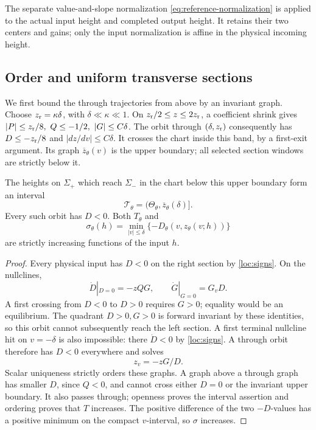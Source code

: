 The separate value-and-slope normalization
\eqref{eq:reference-normalization} is applied to the actual input height
and completed output height. It retains their two centers and gains;
only the input normalization is affine in the physical incoming height.

\subsection{Order and uniform transverse sections}
\label{sec:localization}

We first bound the through trajectories from above by an invariant graph.
Choose \(z_{\rm r}=\kappa\delta\), with
\(\delta\ll\kappa\ll1\). On
\(z_{\rm r}/2\le z\le2z_{\rm r}\), a coefficient shrink gives
\(|P|\le z_{\rm r}/8,\ Q\le-1/2,\ |G|\le C\delta\).
The orbit through \((\delta,z_{\rm r})\) consequently has
\(D\le-z_{\rm r}/8\) and \(|dz/dv|\le C\delta\).
It crosses the chart inside this band, by a first-exit argument.
Its graph \(\overline z_\theta(v)\) is the upper boundary; all
selected section windows are strictly below it.

\begin{lemma}\label{lem:loc-through}
The heights on \(\Sigma_+\) which reach \(\Sigma_-\) in the chart
below this upper boundary form an interval
\begin{equation}\label{loc:through-interval}
 \mathcal T_\theta=(\Theta_\theta,\overline z_\theta(\delta)] .
\end{equation}
Every such orbit has \(D<0\). Both \(T_\theta\) and
\begin{equation}\label{loc:speed-margin}
 \sigma_\theta(h)=\min_{|v|\le\delta}
          \{-D_\theta(v,z_\theta(v;h))\}
\end{equation}
are strictly increasing functions of the input \(h\).
\end{lemma}
\begin{proof}
Every physical input has \(D<0\) on the right section by
\eqref{loc:signs}. On the nullclines,
\begin{equation}\label{loc:nullcline}
 \dot D|_{D=0}=-zQG,\qquad \dot G|_{G=0}=G_vD .
\end{equation}
A first crossing from \(D<0\) to \(D>0\) requires \(G>0\);
equality would be an equilibrium. The quadrant \(D>0,G>0\)
is forward invariant by these identities, so this orbit cannot
subsequently reach the left section. A first terminal nullcline hit on
\(v=-\delta\) is also impossible: there \(\dot D<0\) by
\eqref{loc:signs}. A through orbit therefore has \(D<0\) everywhere
and solves
\begin{equation}\label{loc:graph-equation}
 z_v=-zG/D .
\end{equation}
Scalar uniqueness strictly orders these graphs. A graph above a through
graph has smaller \(D\), since \(Q<0\), and cannot cross either
\(D=0\) or the invariant upper boundary. It also passes through;
openness proves the interval assertion and ordering proves that \(T\)
increases. The positive difference of the two \(-D\)-values has a
positive minimum on the compact \(v\)-interval, so \(\sigma\) increases.
\end{proof}

